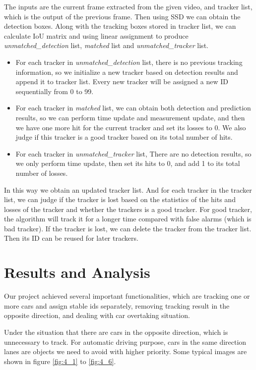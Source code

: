 \documentclass[10pt,twocolumn,letterpaper]{article}
\begin{document}
The inputs are the current frame extracted from the given video, and tracker list, which is the output of the previous frame. Then using SSD we can obtain the detection boxes. Along with the tracking boxes stored in tracker list, we can calculate IoU matrix and using linear assignment to produce \emph{unmatched\_detection} list, \emph{matched} list and \emph{unmatched\_tracker} list. 

\begin{itemize}
\item For each tracker in \emph{unmatched\_detection} list, there is no previous tracking information, so we initialize a new tracker based on detection results and append it to tracker list. Every new tracker will be assigned a new ID sequentially from 0 to 99.
\item For each tracker in \emph{matched} list, we can obtain both detection and prediction results, so we can perform time update and measurement update, and then we have one more hit for the current tracker and set its losses to 0. We also judge if this tracker is a good tracker based on its total number of hits. 
\item For each tracker in \emph{unmatched\_tracker} list, There are no detection results, so we only perform time update, then set its hits to 0, and add 1 to its total number of losses. 
\end{itemize}

In this way we obtain an updated tracker list. And for each tracker in the tracker list, we can judge if the tracker is lost based on the statistics of the hits and losses of the tracker and whether the trackers is a good tracker. For good tracker, the algorithm will track it for a longer time compared with false alarms (which is bad tracker). If the tracker is lost, we can delete the tracker from the tracker list. Then its ID can be reused for later trackers.


\section{Results and Analysis}

Our project achieved several important functionalities, which are tracking one or more cars and assign stable ids separately, removing tracking result in the opposite direction, and dealing with car overtaking situation. 

Under the situation that there are cars in the opposite direction, which is unnecessary to track. For automatic driving purpose, cars in the same direction lanes are objects we need to avoid with higher priority.   Some
typical images are shown in figure \ref{fig:4_1} to \ref{fig:4_6}.
\end{document}
